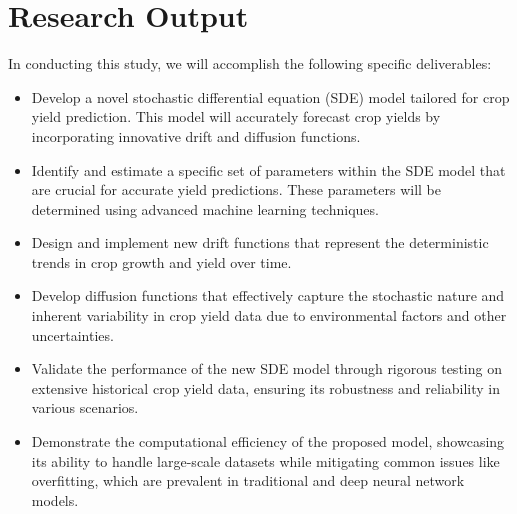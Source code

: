 \section*{Research Output}
In conducting this study, we will accomplish the following specific deliverables:
\begin{itemize}
    \item Develop a novel stochastic differential equation (SDE) model tailored for crop yield prediction. This model will accurately forecast crop yields by incorporating innovative drift and diffusion functions.
    \item Identify and estimate a specific set of parameters within the SDE model that are crucial for accurate yield predictions. These parameters will be determined using advanced machine learning techniques.
    \item Design and implement new drift functions that represent the deterministic trends in crop growth and yield over time.
    \item Develop diffusion functions that effectively capture the stochastic nature and inherent variability in crop yield data due to environmental factors and other uncertainties.
    \item Validate the performance of the new SDE model through rigorous testing on extensive historical crop yield data, ensuring its robustness and reliability in various scenarios.
    \item Demonstrate the computational efficiency of the proposed model, showcasing its ability to handle large-scale datasets while mitigating common issues like overfitting, which are prevalent in traditional and deep neural network models.
\end{itemize}
